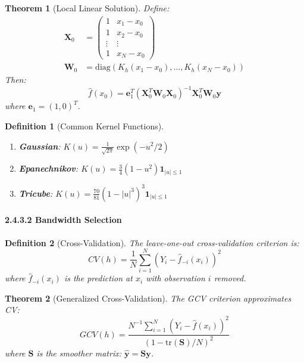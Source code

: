 \documentclass{article}
\newtheorem{definition}{Definition}
\newtheorem{theorem}{Theorem}
\begin{document}
\begin{theorem}[Local Linear Solution]
Define:
\begin{align}
\mathbf{X}_0 &= \begin{pmatrix}
1 & x_1 - x_0 \\
1 & x_2 - x_0 \\
\vdots & \vdots \\
1 & x_N - x_0
\end{pmatrix} \\
\mathbf{W}_0 &= \text{diag}(K_h(x_1 - x_0), \ldots, K_h(x_N - x_0))
\end{align}
Then:
\begin{equation}
\hat{f}(x_0) = \mathbf{e}_1^T(\mathbf{X}_0^T\mathbf{W}_0\mathbf{X}_0)^{-1}\mathbf{X}_0^T\mathbf{W}_0\mathbf{y}
\end{equation}
where $\mathbf{e}_1 = (1, 0)^T$.
\end{theorem}

\begin{definition}[Common Kernel Functions]
\begin{enumerate}
    \item \textbf{Gaussian}: $K(u) = \frac{1}{\sqrt{2\pi}}\exp(-u^2/2)$
    \item \textbf{Epanechnikov}: $K(u) = \frac{3}{4}(1-u^2)\mathbf{1}_{|u| \leq 1}$
    \item \textbf{Tricube}: $K(u) = \frac{70}{81}(1-|u|^3)^3\mathbf{1}_{|u| \leq 1}$
\end{enumerate}
\end{definition}

\paragraph{2.4.3.2 Bandwidth Selection}

\begin{definition}[Cross-Validation]
The leave-one-out cross-validation criterion is:
\begin{equation}
CV(h) = \frac{1}{N}\sum_{i=1}^N (Y_i - \hat{f}_{-i}(x_i))^2
\end{equation}
where $\hat{f}_{-i}(x_i)$ is the prediction at $x_i$ with observation $i$ removed.
\end{definition}

\begin{theorem}[Generalized Cross-Validation]
The GCV criterion approximates CV:
\begin{equation}
GCV(h) = \frac{N^{-1}\sum_{i=1}^N (Y_i - \hat{f}(x_i))^2}{(1 - \text{tr}(\mathbf{S})/N)^2}
\end{equation}
where $\mathbf{S}$ is the smoother matrix: $\hat{\mathbf{y}} = \mathbf{S}\mathbf{y}$.
\end{theorem}
\end{document}

